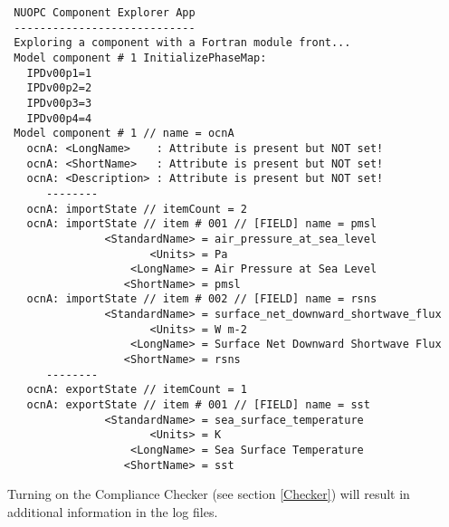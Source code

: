 \begin{verbatim}
 NUOPC Component Explorer App
 ----------------------------
 Exploring a component with a Fortran module front...
 Model component # 1 InitializePhaseMap:
   IPDv00p1=1
   IPDv00p2=2
   IPDv00p3=3
   IPDv00p4=4
 Model component # 1 // name = ocnA
   ocnA: <LongName>    : Attribute is present but NOT set!
   ocnA: <ShortName>   : Attribute is present but NOT set!
   ocnA: <Description> : Attribute is present but NOT set!
      --------
   ocnA: importState // itemCount = 2
   ocnA: importState // item # 001 // [FIELD] name = pmsl
               <StandardName> = air_pressure_at_sea_level
                      <Units> = Pa
                   <LongName> = Air Pressure at Sea Level
                  <ShortName> = pmsl
   ocnA: importState // item # 002 // [FIELD] name = rsns
               <StandardName> = surface_net_downward_shortwave_flux
                      <Units> = W m-2
                   <LongName> = Surface Net Downward Shortwave Flux
                  <ShortName> = rsns
      --------
   ocnA: exportState // itemCount = 1
   ocnA: exportState // item # 001 // [FIELD] name = sst
               <StandardName> = sea_surface_temperature
                      <Units> = K
                   <LongName> = Sea Surface Temperature
                  <ShortName> = sst
\end{verbatim}

Turning on the Compliance Checker (see section \ref{Checker}) will result in additional information in the log files.






